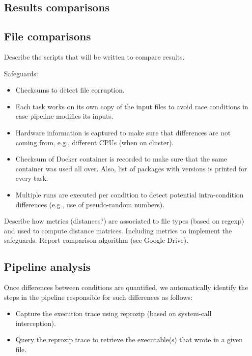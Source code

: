 \documentclass{article}
\begin{document}
\subsection{Results comparisons}
\subsection{File comparisons}

Describe the scripts that will be written to compare results.

Safeguards:
\begin{itemize}
\item Checksums to detect file corruption.
\item Each task works on its own copy of the input files to avoid race conditions in case pipeline modifies its inputs.
\item Hardware information is captured to make sure that differences are not coming from, e.g., different CPUs (when on cluster).
\item Checksum of Docker container is recorded to make sure that the same container was used all over. Also, list of packages with versions is printed for every task. 
\item Multiple runs are executed per condition to detect potential intra-condition differences (e.g., use of pseudo-random numbers).
\end{itemize}

Describe how metrics (distances?) are associated to file types (based on regexp) and used to compute distance matrices. Including metrics to implement the safeguards. Report comparison algorithm (see Google Drive).

\subsection{Pipeline analysis}

Once differences between conditions are quantified, we automatically identify the steps in the pipeline responsible for such differences as follows:
\begin{itemize}
\item Capture the execution trace using reprozip (based on system-call interception).
\item Query the reprozip trace to retrieve the executable(s) that wrote in a given file.
\end{itemize}

\end{document}
